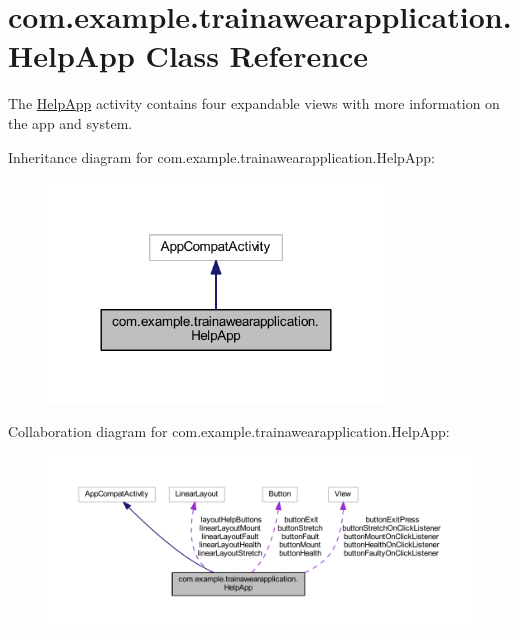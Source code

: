 \hypertarget{classcom_1_1example_1_1trainawearapplication_1_1_help_app}{}\section{com.\+example.\+trainawearapplication.\+Help\+App Class Reference}
\label{classcom_1_1example_1_1trainawearapplication_1_1_help_app}


The \mbox{\hyperlink{classcom_1_1example_1_1trainawearapplication_1_1_help_app}{Help\+App}} activity contains four expandable views with more information on the app and system.  




Inheritance diagram for com.\+example.\+trainawearapplication.\+Help\+App\+:
\nopagebreak
\begin{figure}[H]
\begin{center}
\leavevmode
\includegraphics[width=252pt]{classcom_1_1example_1_1trainawearapplication_1_1_help_app__inherit__graph}
\end{center}
\end{figure}


Collaboration diagram for com.\+example.\+trainawearapplication.\+Help\+App\+:
\nopagebreak
\begin{figure}[H]
\begin{center}
\leavevmode
\includegraphics[width=350pt]{classcom_1_1example_1_1trainawearapplication_1_1_help_app__coll__graph}
\end{center}
\end{figure}
